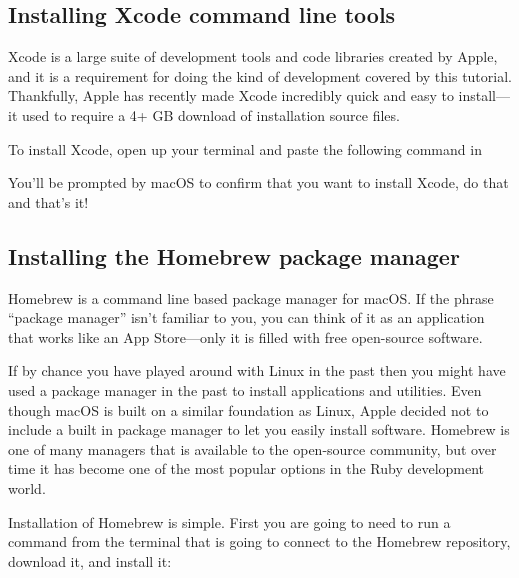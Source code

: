 \subsection{Installing Xcode command line tools}

\label{sec:shiny_xcode}

Xcode is a large suite of development tools and code libraries created by Apple, and it is a requirement for doing the kind of development covered by this tutorial. Thankfully, Apple has recently made Xcode incredibly quick and easy to install---it used to require a 4+ GB download of installation source files.

To install Xcode, open up your terminal and paste the following command in

\begin{codelisting}
\label{code:xcode-install}
\end{codelisting}

You'll be prompted by macOS to confirm that you want to install Xcode, do that and that's it!

\subsection{Installing the Homebrew package manager}

\label{sec:homebrew}

Homebrew is a command line based package manager for macOS\@. If the phrase ``package manager'' isn't familiar to you, you can think of it as an application that works like an App Store---only it is filled with free open-source software.

If by chance you have played around with Linux in the past then you might have used a package manager in the past to install applications and utilities. Even though macOS is built on a similar foundation as Linux, Apple decided not to include a built in package manager to let you easily install software. Homebrew is one of many managers that is available to the open-source community, but over time it has become one of the most popular options in the Ruby development world.

Installation of Homebrew is simple. First you are going to need to run a command from the terminal that is going to connect to the Homebrew repository, download it, and install it:

